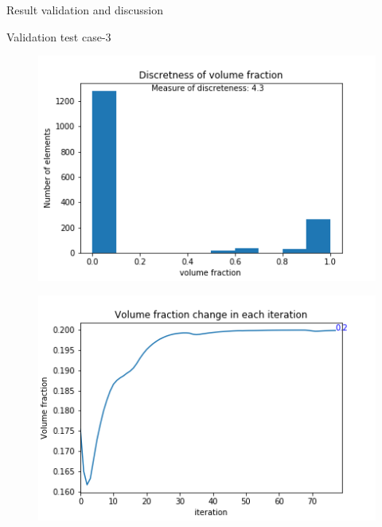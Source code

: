 \documentclass[a4paper,12pt,times]{article}
\begin{document}
\begin{section}{Result validation and discussion}
\begin{subsection}{Validation test case-3}
\begin{figure}[H]
\begin{minipage}{.5\textwidth}
		\centering
		\includegraphics[width=1\linewidth]{MMA_03_discretness.png}
		\label{VC-05.5}
	\end{minipage}%
	\begin{minipage}{.5\textwidth}
		\centering
		\includegraphics[width=1\linewidth]{MMA_03_Volume_fractionVSiteration.png}
		\label{VC-05.6}
	\end{minipage}
\end{figure} 


\end{subsection}
\end{section}
\end{document}
